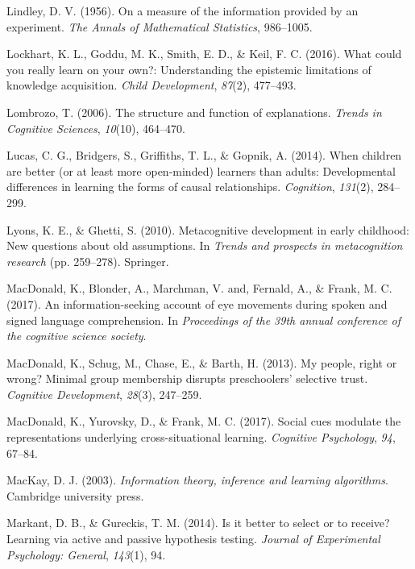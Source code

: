 \documentclass[english,floatsintext,man]{apa6}
\theoremstyle{definition}
\theoremstyle{definition}
\theoremstyle{definition}
\theoremstyle{remark}
\begin{document}
\hypertarget{ref-lindley1956measure}{}
Lindley, D. V. (1956). On a measure of the information provided by an
experiment. \emph{The Annals of Mathematical Statistics}, 986--1005.

\hypertarget{ref-lockhart2016could}{}
Lockhart, K. L., Goddu, M. K., Smith, E. D., \& Keil, F. C. (2016). What
could you really learn on your own?: Understanding the epistemic
limitations of knowledge acquisition. \emph{Child Development},
\emph{87}(2), 477--493.

\hypertarget{ref-lombrozo2006structure}{}
Lombrozo, T. (2006). The structure and function of explanations.
\emph{Trends in Cognitive Sciences}, \emph{10}(10), 464--470.

\hypertarget{ref-lucas2014children}{}
Lucas, C. G., Bridgers, S., Griffiths, T. L., \& Gopnik, A. (2014). When
children are better (or at least more open-minded) learners than adults:
Developmental differences in learning the forms of causal relationships.
\emph{Cognition}, \emph{131}(2), 284--299.

\hypertarget{ref-lyons2010metacognitive}{}
Lyons, K. E., \& Ghetti, S. (2010). Metacognitive development in early
childhood: New questions about old assumptions. In \emph{Trends and
prospects in metacognition research} (pp. 259--278). Springer.

\hypertarget{ref-macdonald2017info}{}
MacDonald, K., Blonder, A., Marchman, V. and, Fernald, A., \& Frank, M.
C. (2017). An information-seeking account of eye movements during spoken
and signed language comprehension. In \emph{Proceedings of the 39th
annual conference of the cognitive science society}.

\hypertarget{ref-macdonald2013my}{}
MacDonald, K., Schug, M., Chase, E., \& Barth, H. (2013). My people,
right or wrong? Minimal group membership disrupts preschoolers'
selective trust. \emph{Cognitive Development}, \emph{28}(3), 247--259.

\hypertarget{ref-macdonald2017social}{}
MacDonald, K., Yurovsky, D., \& Frank, M. C. (2017). Social cues
modulate the representations underlying cross-situational learning.
\emph{Cognitive Psychology}, \emph{94}, 67--84.

\hypertarget{ref-mackay2003information}{}
MacKay, D. J. (2003). \emph{Information theory, inference and learning
algorithms}. Cambridge university press.

\hypertarget{ref-markant2014better}{}
Markant, D. B., \& Gureckis, T. M. (2014). Is it better to select or to
receive? Learning via active and passive hypothesis testing.
\emph{Journal of Experimental Psychology: General}, \emph{143}(1), 94.
\end{document}
